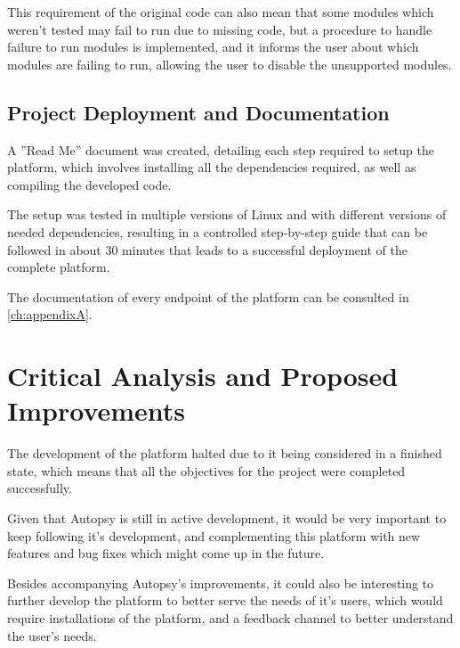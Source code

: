 This requirement of the original code can also mean that some modules which weren't tested may fail to run due to missing code, but a procedure to handle failure to run modules is implemented, 
and it informs the user about which modules are failing to run, allowing the user to disable the unsupported modules.

\subsection{Project Deployment and Documentation}

A ''Read Me'' document was created, detailing each step required to setup the platform, which involves installing all the dependencies required, as well as compiling the developed code.

The setup was tested in multiple versions of Linux and with different versions of needed dependencies, resulting in a controlled step-by-step guide that can be followed in about 30 minutes that leads to a successful deployment of the complete platform.

The documentation of every endpoint of the platform can be consulted in \autoref{ch:appendixA}.

\section{Critical Analysis and Proposed Improvements}

The development of the platform halted due to it being considered in a finished state, which means that all the objectives for the project were completed successfully.

Given that Autopsy is still in active development, it would be very important to keep following it's development, and complementing this platform with new features and bug fixes which might come up in the future.

Besides accompanying Autopsy's improvements, it could also be interesting to further develop the platform to better serve the needs of it's users, which would require installations of the platform, and a feedback channel to better understand the user's needs.
